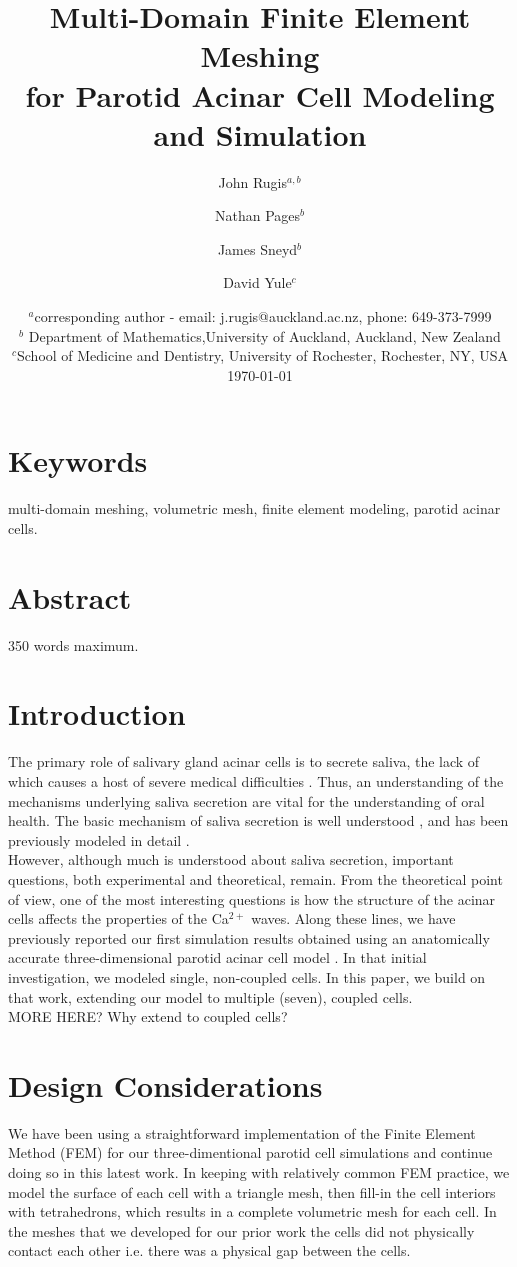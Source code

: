 \documentclass[a4paper,10pt]{article}
\title{Multi-Domain Finite Element Meshing\\for Parotid Acinar Cell Modeling and Simulation}
\author{John Rugis$^{a,b}$ \and Nathan Pages$^b$ \and James Sneyd$^b$ \and David Yule$^c$}
\date{%
  $^a$corresponding author - email: j.rugis@auckland.ac.nz, phone: 649-373-7999\\%
  $^b$ Department of Mathematics,University of Auckland, Auckland, New Zealand\\%
  $^c$School of Medicine and Dentistry, University of Rochester, Rochester, NY, USA\\[2ex]%
  \today
}
\begin{document}
\maketitle

\section*{Keywords}
multi-domain meshing, volumetric mesh, finite element modeling, parotid acinar cells.\\

\section*{Abstract}
350 words maximum.\\

\section{Introduction}
The primary role of salivary gland acinar cells is to secrete saliva, the lack of which causes a host of severe medical difficulties \cite{fox1985,melvin1991}. Thus, an understanding of the mechanisms underlying saliva secretion are vital for the understanding of oral health.  The basic mechanism of saliva secretion is well understood \cite{nauntofte1992}, and has been previously modeled in detail \cite{sneyd2003}.\\

However, although much is understood about saliva secretion, important questions, both experimental and theoretical, remain. From the theoretical point of view, one of the most interesting questions is how the structure of the acinar cells affects the properties of the Ca$^{2+}$ waves. Along these lines, we have previously reported our first simulation results obtained using an anatomically accurate three-dimensional parotid acinar cell model \cite{Sneyd2017383}. In that initial investigation, we modeled single, non-coupled cells. In this paper, we build on that work, extending our model to multiple (seven), coupled cells.\\   
MORE HERE? Why extend to coupled cells?\\

\section{Design Considerations}
We have been using a straightforward implementation of the Finite Element Method (FEM) \cite{gockenbach2006understanding,Hughes2000,gosz2005finite} for our three-dimentional parotid cell simulations and continue doing so in this latest work. In keeping with relatively common FEM practice, we model the surface of each cell with a triangle mesh, then fill-in the cell interiors with tetrahedrons, which results in a complete volumetric mesh for each cell. In the meshes that we developed for our prior work the cells did not physically contact each other i.e. there was a physical gap between the cells.\\
\end{document}
